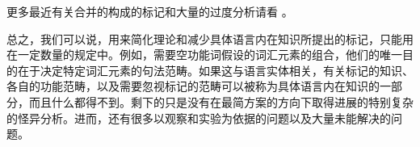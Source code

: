 
更多最近有关合并的构成的标记和大量的过度分析请看 。

总之，我们可以说，用来简化理论和减少具体语言内在知识所提出的标记，只能用在一定数量的规定中。例如，需要空功能词假设的词汇元素的组合，他们的唯一目的在于决定特定词汇元素的句法范畴。如果这与语言实体相关，有关标记的知识、各自的功能范畴，以及需要忽视标记的范畴可以被称为具体语言内在知识的一部分，而且什么都得不到。剩下的只是没有在最简方案的方向下取得进展的特别复杂的怪异分析。进而，还有很多以观察和实验为依据的问题以及大量未能解决的问题。

